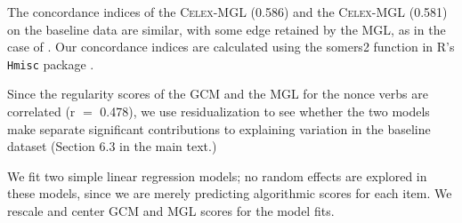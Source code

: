 \documentclass[12pt]{article}
\begin{document}
The concordance indices of the \textsc{Celex}-MGL (0.586) and the \textsc{Celex}-MGL (0.581) on the baseline data are similar, with some edge retained by the MGL, as in the case of \cite{albright2003rules}. Our concordance indices are calculated using the somers2 function in R's \texttt{Hmisc} package \citep{harrell2014hmisc}. 

Since the regularity scores of the GCM and the MGL for the nonce verbs are correlated  (r $=$ 0.478), we use residualization to see whether the two models make separate significant contributions to explaining variation in the baseline dataset (Section 6.3 in the main text.)

We fit two simple linear regression models; no random effects are explored in these models, since we are merely predicting algorithmic scores for each item. We rescale and center GCM and MGL scores for the model fits. 
\end{document}
